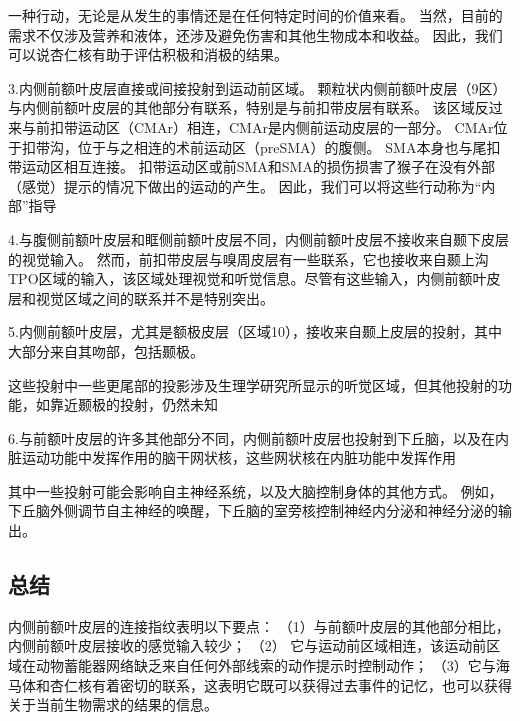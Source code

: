 一种行动，无论是从发生的事情还是在任何特定时间的价值来看。
当然，目前的需求不仅涉及营养和液体，还涉及避免伤害和其他生物成本和收益。
因此，我们可以说杏仁核有助于评估积极和消极的结果。\par


3.内侧前额叶皮层直接或间接投射到运动前区域。
颗粒状内侧前额叶皮层（9区）与内侧前额叶皮层的其他部分有联系，特别是与前扣带皮层有联系\cite{vogt1987cingulate}。
该区域反过来与前扣带运动区（CMAr）相连，CMAr是内侧前运动皮层的一部分\cite{morecraft1998convergence}。
CMAr位于扣带沟\cite{dum2002motor}，位于与之相连的术前运动区（preSMA）的腹侧\cite{luppino1993corticocortical}。
SMA本身也与尾扣带运动区相互连接\cite{luppino1993corticocortical}。
扣带运动区或前SMA和SMA的损伤损害了猴子在没有外部（感觉）提示的情况下做出的运动的产生\cite{thaler1995functions}。
因此，我们可以将这些行动称为“内部”指导\par


4.与腹侧前额叶皮层和眶侧前额叶皮层不同，内侧前额叶皮层不接收来自颞下皮层的视觉输入\cite{carmichael1995sensory,kondo2005differential}。
然而，前扣带皮层与嗅周皮层有一些联系，它也接收来自颞上沟TPO区域的输入\cite{kondo2005differential}，该区域处理视觉和听觉信息。尽管有这些输入，内侧前额叶皮层和视觉区域之间的联系并不是特别突出。\par


5.内侧前额叶皮层，尤其是额极皮层（区域10），接收来自颞上皮层的投射，其中大部分来自其吻部，包括颞极\cite{barbas1999medial,kondo2003differential}。\par
这些投射中一些更尾部的投影涉及生理学研究所显示的听觉区域\cite{hackett1998subdivisions}，但其他投射的功能，如靠近颞极的投射，仍然未知\par


6.与前额叶皮层的许多其他部分不同，内侧前额叶皮层也投射到下丘脑\cite{rempel1998topographic}，以及在内脏运动功能中发挥作用的脑干网状核，这些网状核在内脏功能中发挥作用\cite{ongur1998prefrontal}\par


其中一些投射可能会影响自主神经系统，以及大脑控制身体的其他方式。
例如，下丘脑外侧调节自主神经的唤醒，下丘脑的室旁核控制神经内分泌和神经分泌的输出。\par



\subsection{总结}

内侧前额叶皮层的连接指纹表明以下要点：
（1）与前额叶皮层的其他部分相比，内侧前额叶皮层接收的感觉输入较少；
（2） 它与运动前区域相连，该运动前区域在动物蓄能器网络缺乏来自任何外部线索的动作提示时控制动作；
（3）它与海马体和杏仁核有着密切的联系，这表明它既可以获得过去事件的记忆，也可以获得关于当前生物需求的结果的信息。\par


